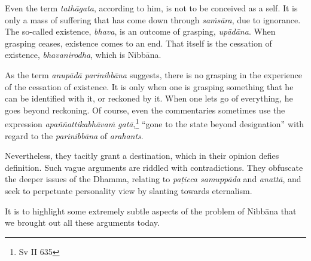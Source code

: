 Even the term \emph{tathāgata}, according to him, is not to be conceived as a self. It is only a mass of suffering that has come down through \emph{saṁsāra}, due to ignorance. The so-called existence, \emph{bhava}, is an outcome of grasping, \emph{upādāna}. When grasping ceases, existence comes to an end. That itself is the cessation of existence, \emph{bhavanirodha}, which is Nibbāna.

As the term \emph{anupādā parinibbāna} suggests, there is no grasping in the experience of the cessation of existence. It is only when one is grasping something that he can be identified with it, or reckoned by it. When one lets go of everything, he goes beyond reckoning. Of course, even the commentaries sometimes use the expression \emph{apaññattikabhāvaṁ gatā},\footnote{Sv II 635} ``gone to the state beyond designation'' with regard to the \emph{parinibbāna} of \emph{arahants}.

Nevertheless, they tacitly grant a destination, which in their opinion defies definition. Such vague arguments are riddled with contradictions. They obfuscate the deeper issues of the Dhamma, relating to \emph{paṭicca samuppāda} and \emph{anattā}, and seek to perpetuate personality view by slanting towards eternalism.

It is to highlight some extremely subtle aspects of the problem of Nibbāna that we brought out all these arguments today.
